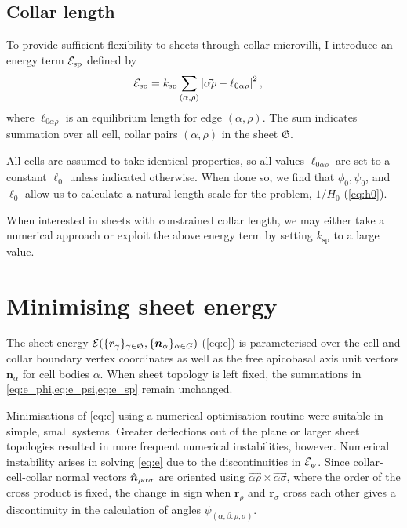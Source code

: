 \subsection{Collar length}

To provide sufficient flexibility to sheets through collar microvilli, I introduce an energy term $\mathcal{E}_{\text{sp}}$ defined by 
\begin{align}
	\mathcal{E}_{\text{sp}} &= k_{\text{sp}} \sum_{(\alpha, \rho)} \left| \vec{\alpha\rho} - \ell_{0\alpha\rho} \right|^2, \label{eq:e_sp}
\end{align}
\noindent where $\ell_{0\alpha\rho}$ is an equilibrium length for edge $(\alpha, \rho)$. The sum indicates summation over all cell, collar pairs $(\alpha, \rho)$ in the sheet $\mathfrak{G}$.

All cells are assumed to take identical properties, so all values $\ell_{0\alpha\rho}$ are set to a constant $\ell_0$ unless indicated otherwise. 
When done so, we find that $\phi_0, \psi_0$, and $\ell_0$ allow us to calculate a natural length scale for the problem, $1/H_0$ (\cref{eq:h0}).

When interested in sheets with constrained collar length, we may either take a numerical approach or exploit the above energy term by setting $k_{\text{sp}}$ to a large value. 

\section{Minimising sheet energy} \label{sec:minimise_energy}

The sheet energy $\mathcal{E}(\{\bm{r}_\gamma \}_{\gamma \in \mathfrak{G}}, \{\bm{n}_\alpha\}_{\alpha\in G})$ (\cref{eq:e}) is parameterised over the cell and collar boundary vertex coordinates as well as the free apicobasal axis unit vectors $\bm{n}_\alpha$ for cell bodies $\alpha$.
When sheet topology is left fixed, the summations in \cref{eq:e_phi,eq:e_psi,eq:e_sp} remain unchanged.

Minimisations of \cref{eq:e} using a numerical optimisation routine were suitable in simple, small systems. 
Greater deflections out of the plane or larger sheet topologies resulted in more frequent numerical instabilities, however.
Numerical instability arises in solving \cref{eq:e} due to the discontinuities in $\mathcal{E}_\psi$. 
Since collar-cell-collar normal vectors $\hat{\bm{n}}_{\rho\alpha\sigma}$ are oriented using $\vec{\alpha\rho} \times\vec{\alpha\sigma}$, where the order of the cross product is fixed, the change in sign when $\bm{r}_\rho$ and $\bm{r}_\sigma$ cross each other gives a discontinuity in the calculation of angles $\psi_{(\alpha,\beta:\rho,\sigma)}$. 

